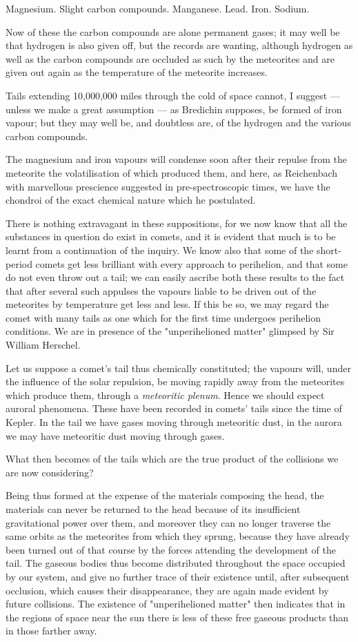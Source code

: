 \documentclass[a4paper, 12pt, oneside, polutonikogreek, english]{article}
\begin{document}
Magnesium. 
Slight carbon compounds. 
Manganese. 
Lead. 
Iron. 
Sodium. 

Now of these the carbon compounds are alone permanent gases; it may well be that hydrogen is also given off, but the records are wanting, although hydrogen as well as the carbon compounds are occluded as such by the meteorites and are given out again as the temperature of the meteorite increases.

Tails extending 10,000,000 miles through the cold of space cannot, I suggest --- unless we make a great assumption --- as Bredichin supposes, be formed of iron vapour; but they may well be, and doubtless are, of the hydrogen and the various carbon compounds.

The magnesium and iron vapours will condense soon after their repulse from the meteorite the volatilisation of which produced them, and here, as Reichenbach with marvellous prescience suggested in pre-spectroscopic times, we have the chondroi of the exact chemical nature which he postulated.

There is nothing extravagant in these suppositions, for we now know that all the substances in question do exist in comets, and it is evident that much is to be learnt from a continuation of the inquiry. We know also that some of the short-period comets get less brilliant with every approach to perihelion, and that some do not even throw out a tail; we can easily ascribe both these results to the fact that after several such appulses the vapours liable to be driven out of the meteorites by temperature get less and less. If this be so, we may regard the comet with many tails as one which for the first time undergoes perihelion conditions. We are in presence of the "unperihelioned matter" glimpsed by Sir William Herschel.

Let us suppose a comet's tail thus chemically constituted; the vapours will, under the influence of the solar repulsion, be moving rapidly away from the meteorites which produce them, through a \emph{meteoritic plenum}. Hence we should expect auroral phenomena. These have been recorded in comets' tails since the time of Kepler. In the tail we have gases moving through meteoritic dust, in the aurora we may have meteoritic dust moving through gases.

What then becomes of the tails which are the true product of the collisions we are now considering?

Being thus formed at the expense of the materials composing the head, the materials can never be returned to the head because of its insufficient gravitational power over them, and moreover they can no longer traverse the same orbits as the meteorites from which they sprung, because they have already been turned out of that course by the forces attending the development of the tail. The gaseous bodies thus become distributed throughout the space occupied by our system, and give no further trace of their existence until, after subsequent occlusion, which causes their disappearance, they are again made evident by future collisions. The existence of "unperihelioned matter" then indicates that in the regions of space near the sun there is less of these free gaseous products than in those farther away.
\end{document}
